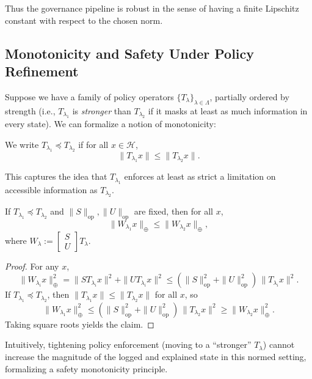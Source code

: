 \documentclass[11pt]{article}
\begin{document}
Thus the governance pipeline is robust in the sense of having a finite Lipschitz constant with respect to the chosen norm.

\subsection{Monotonicity and Safety Under Policy Refinement}

Suppose we have a family of policy operators $\{T_\lambda\}_{\lambda \in \Lambda}$, partially ordered by strength (i.e., $T_{\lambda_1}$ is \emph{stronger} than $T_{\lambda_2}$ if it masks at least as much information in every state). 
We can formalize a notion of monotonicity:

\begin{definition}
We write $T_{\lambda_1} \preceq T_{\lambda_2}$ if for all $x \in \mathcal{H}$,
\[
  \|T_{\lambda_1} x\| \le \|T_{\lambda_2} x\|.
\]
\end{definition}

This captures the idea that $T_{\lambda_1}$ enforces at least as strict a limitation on accessible information as $T_{\lambda_2}$.

\begin{proposition}
\label{prop:monotone}
If $T_{\lambda_1} \preceq T_{\lambda_2}$ and $\|S\|_{\mathrm{op}}, \|U\|_{\mathrm{op}}$ are fixed, then for all $x$,
\[
  \|W_{\lambda_1} x\|_{\oplus} \le \|W_{\lambda_2} x\|_{\oplus},
\]
where $W_{\lambda} := \begin{bmatrix} S \\ U \end{bmatrix} T_{\lambda}$.
\end{proposition}

\begin{proof}
For any $x$,
\[
  \|W_{\lambda_i} x\|_{\oplus}^2 = \|S T_{\lambda_i} x\|^2 + \|U T_{\lambda_i} x\|^2
  \le (\|S\|_{\mathrm{op}}^2 + \|U\|_{\mathrm{op}}^2) \, \|T_{\lambda_i} x\|^2.
\]
If $T_{\lambda_1} \preceq T_{\lambda_2}$, then $\|T_{\lambda_1} x\| \le \|T_{\lambda_2} x\|$ for all $x$, so
\[
  \|W_{\lambda_1} x\|_{\oplus}^2 \le (\|S\|_{\mathrm{op}}^2 + \|U\|_{\mathrm{op}}^2) \, \|T_{\lambda_2} x\|^2
  \ge \|W_{\lambda_2} x\|_{\oplus}^2.
\]
Taking square roots yields the claim.
\end{proof}

Intuitively, tightening policy enforcement (moving to a ``stronger'' $T_\lambda$) cannot increase the magnitude of the logged and explained state in this normed setting, formalizing a safety monotonicity principle.
\end{document}
